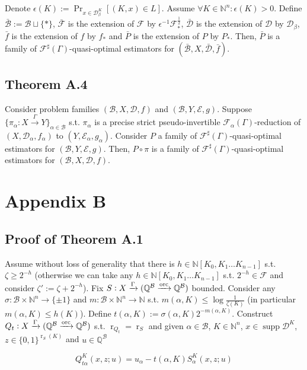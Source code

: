 \documentclass[a4paper]{article}
\newcommand{\Bool}{\{0,1\}}
\newcommand{\WordsLen}[1]{{\Bool^{#1}}}
\DeclareMathOperator{\Supp}{supp}
\DeclareMathOperator{\Prb}{Pr}
\DeclareMathOperator{\R}{r}
\newcommand{\Nats}{\mathbb{N}}
\newcommand{\Rats}{\mathbb{Q}}
\newcommand{\NatPoly}{\Nats[K_0, K_1 \ldots K_{n-1}]}
\newcommand{\NatFun}{\Nats^n \rightarrow}
\newcommand{\Dist}{\mathcal{D}}
\newcommand{\Fall}{\mathcal{F}}
\newcommand{\ESG}{\Fall^\sharp(\Gamma)}
\newcommand{\Scheme}{\xrightarrow{\Gamma}}
\newcommand{\ORC}{\xrightarrow{\textnormal{orc}}}
\newcommand{\Base}{\mathcal{B}}
\newcommand{\QBO}{\Rats^\Base \ORC \Rats^\Base}
\begin{document}
Denote ${\epsilon(K):=\Prb_{x \in \Dist_\beta^K}[(K,x) \in L]}$. Assume ${\forall K \in \Nats^n: \epsilon(K) > 0}$. Define ${\bar{\Base}:=\Base \sqcup \{*\}}$, ${\bar{\Fall}}$ is the extension of ${\Fall}$ by ${\epsilon^{-1}\Fall_*^\frac{1}{2}}$, ${\bar{\Dist}}$ is the extension of ${\Dist}$ by ${\Dist_\beta}$, ${\bar{f}}$ is the extension of ${f}$ by ${f_*}$ and ${\bar{P}}$ is the extension of ${P}$ by ${P_*}$. Then, ${\bar{P}}$ is a family of ${\ESG}$-quasi-optimal estimators for ${(\bar{\Base},X,\bar{\Dist},\bar{f})}$.

\subsection{Theorem A.4}

Consider problem families ${(\Base,X,\Dist,f)}$ and ${(\Base,Y,\mathcal{E},g)}$. Suppose ${\{\pi_\alpha: X \Scheme Y\}_{\alpha \in \Base}}$ s.t. ${\pi_\alpha}$ is a precise strict pseudo-invertible ${\Fall_\alpha(\Gamma)}$-reduction of ${(X,\Dist_\alpha,f_\alpha)}$ to ${(Y,\mathcal{E}_\alpha,g_\alpha)}$. Consider ${P}$ a family of ${\ESG}$-quasi-optimal estimators for ${(\Base,Y,\mathcal{E},g)}$. Then, ${P \circ \pi}$ is a family of ${\ESG}$-quasi-optimal estimators for ${(\Base,X,\Dist,f)}$.

\section{Appendix B}

\subsection{Proof of Theorem A.1}

Assume without loss of generality that there is ${h \in \NatPoly}$ s.t. $\zeta \geq 2^{-h}$ (otherwise we can take any $h \in \NatPoly$ s.t. $2^{-h} \in \Fall$ and consider $\zeta':=\zeta+2^{-h}$). Fix ${S: X \Scheme (\QBO)}$ bounded. Consider any ${\sigma: \Base \times \NatFun \{ \pm 1 \}}$ and $m: \Base \times \NatFun \Nats$ s.t. $m(\alpha,K) \leq \log \frac{1}{\zeta(K)}$ (in particular ${m(\alpha,K) \leq h(K)}$). Define ${t(\alpha,K) := \sigma(\alpha,K) 2^{-m(\alpha,K)}}$. Construct ${Q_t: X \Scheme (\QBO)}$ s.t. ${\R_{Q_t}=\R_S}$ and given ${\alpha \in \Base}$, $K \in \Nats^n$, $x \in \Supp \Dist^{K}$, ${z \in \WordsLen{ \R_S(K)}}$ and ${u \in \Rats^\Base}$

$$Q_{t\alpha}^{K}(x,z;u) = u_\alpha - t(\alpha,K) S_\alpha^{K}(x,z;u)$$
\end{document}
